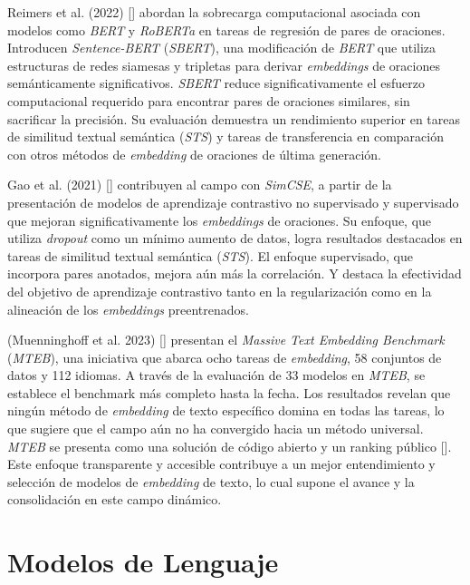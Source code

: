     Reimers et al. (2022) [\cite{reimers2019sentencebert}] abordan la sobrecarga computacional asociada con modelos como \emph{BERT} y \emph{RoBERTa} en tareas de regresión de pares de oraciones. Introducen \emph{Sentence-BERT} (\emph{SBERT}), una modificación de \emph{BERT} que utiliza estructuras de redes siamesas y tripletas para derivar \emph{embeddings} de oraciones semánticamente significativos. \emph{SBERT} reduce significativamente el esfuerzo computacional requerido para encontrar pares de oraciones similares, sin sacrificar la precisión. Su evaluación demuestra un rendimiento superior en tareas de similitud textual semántica (\emph{STS}) y tareas de transferencia en comparación con otros métodos de \emph{embedding} de oraciones de última generación.

    Gao et al. (2021) [\cite{gao2022simcse}] contribuyen al campo con \emph{SimCSE}, a partir de la presentación de modelos de aprendizaje contrastivo no supervisado y supervisado que mejoran significativamente los \emph{embeddings} de oraciones. Su enfoque, que utiliza \emph{dropout} como un mínimo aumento de datos, logra resultados destacados en tareas de similitud textual semántica (\emph{STS}). El enfoque supervisado, que incorpora pares anotados, mejora aún más la correlación. Y destaca la efectividad del objetivo de aprendizaje contrastivo tanto en la regularización como en la alineación de los \emph{embeddings} preentrenados.

    (Muenninghoff et al. 2023) [\cite{muennighoff2023mteb}] presentan el \emph{Massive Text Embedding Benchmark} (\emph{MTEB}), una iniciativa que abarca ocho tareas de \emph{embedding}, 58 conjuntos de datos y 112 idiomas. A través de la evaluación de 33 modelos en \emph{MTEB}, se establece el benchmark más completo hasta la fecha. Los resultados revelan que ningún método de \emph{embedding} de texto específico domina en todas las tareas, lo que sugiere que el campo aún no ha convergido hacia un método universal. \emph{MTEB} se presenta como una solución de código abierto y un ranking público  [\cite{leaderboard}]. Este enfoque transparente y accesible contribuye a un mejor entendimiento y selección de modelos de \emph{embedding} de texto, lo cual supone el avance y la consolidación en este campo dinámico.

\section{Modelos de Lenguaje}
   
